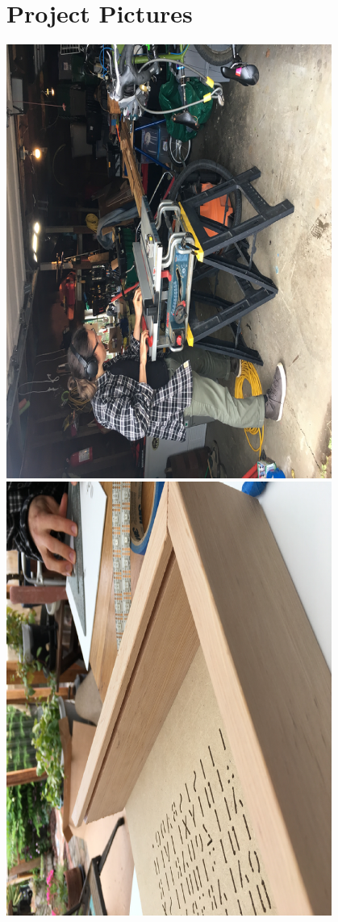 \documentclass[onecolumn, draftclsnofoot,10pt, compsoc]{IEEEtran}
\begin{document}
\section{Project Pictures}
\centering
\includegraphics[width=0.8\textwidth, natwidth=600,natheight=800]{./exPics/scott.eps} %
\includegraphics[width=0.8\textwidth, natwidth=600,natheight=800]{./exPics/wood.eps}
\end{document}
